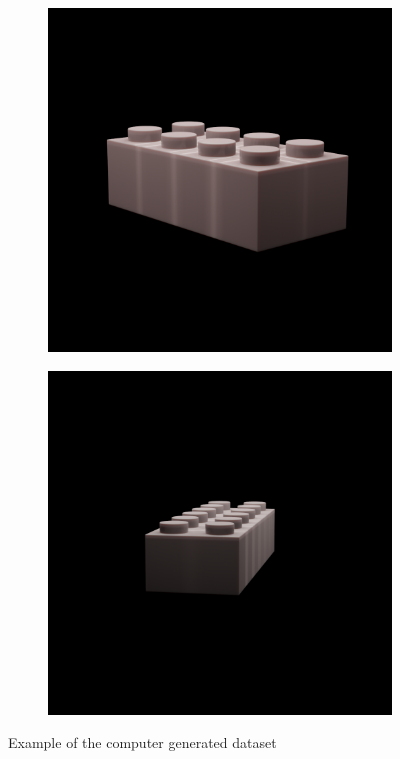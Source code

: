 \documentclass[]{article}
\begin{document}
\begin{figure}[h]
\begin{subfigure}[b]{0.2\textwidth}
    \end{subfigure}
    \begin{subfigure}[b]{0.2\textwidth}
        \includegraphics[width=\textwidth]{generated images/39.png}
    \end{subfigure}
    \begin{subfigure}[b]{0.2\textwidth}
        \includegraphics[width=\textwidth]{generated images/40.png}
    \end{subfigure}
    \caption{Example of the computer generated dataset}
\end{figure}
\end{document}
